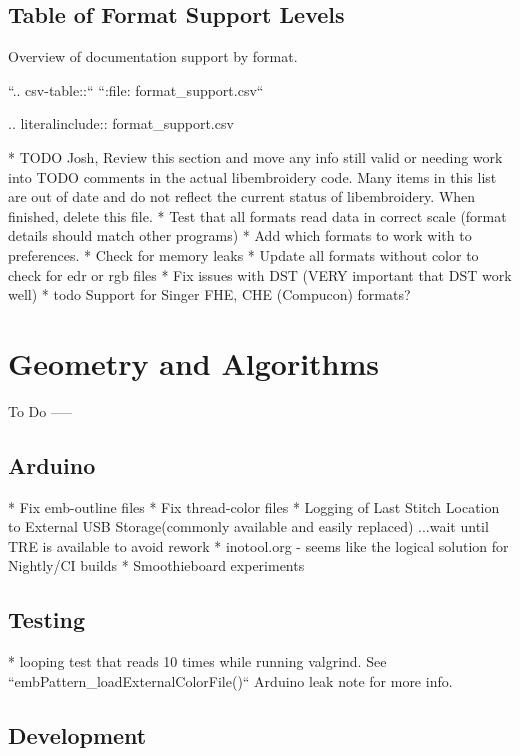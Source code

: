 \documentclass[a4paper]{report}
\begin{document}
\subsection{Table of Format Support Levels}

Overview of documentation support by format.

``.. csv-table::``
``:file: format\_support.csv``

.. literalinclude:: format\_support.csv

* TODO Josh, Review this section and move any info still valid or needing work into TODO comments in the actual libembroidery code. Many items in this list are out of date and do not reflect the current status of libembroidery. When finished, delete this file.
  * Test that all formats read data in correct scale (format details should match other programs)
  * Add which formats to work with to preferences.
  * Check for memory leaks
  * Update all formats without color to check for edr or rgb files
  * Fix issues with DST (VERY important that DST work well)
* todo Support for Singer FHE, CHE (Compucon) formats?

\section{Geometry and Algorithms}

To Do
-----

\subsection{Arduino}

* Fix emb-outline files
* Fix thread-color files
* Logging of Last Stitch Location to External USB Storage(commonly available and easily replaced) ...wait until TRE is available to avoid rework
* inotool.org - seems like the logical solution for Nightly/CI builds
* Smoothieboard experiments

\subsection{Testing}

* looping test that reads 10 times while running valgrind. See ``embPattern\_loadExternalColorFile()`` Arduino leak note for more info.

\subsection{Development}
\end{document}
